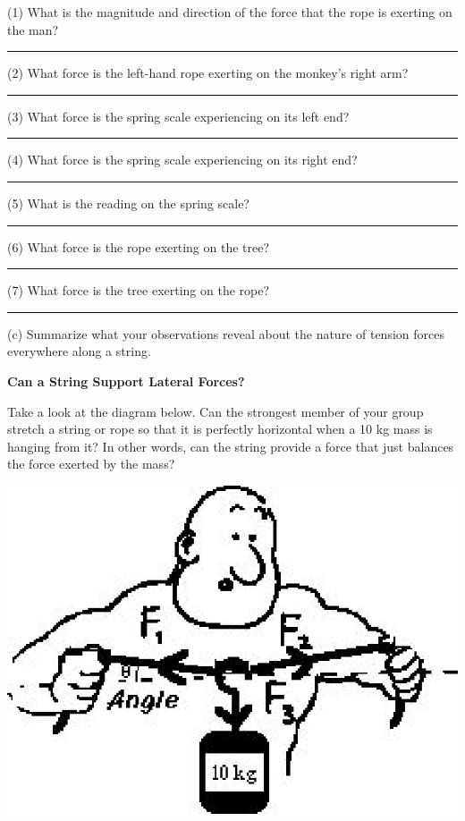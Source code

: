 (1) What is the magnitude and direction of the force that the rope is exerting
on the man? \rule{1.0in}{0.1pt}

(2) What force is the left-hand rope exerting on the monkey's right arm? \rule{1.0in}{0.1pt}

(3) What force is the spring scale experiencing on its left end? \rule{1.0in}{0.1pt}

(4) What force is the spring scale experiencing on its right end? \rule{1.0in}{0.1pt}

(5) What is the reading on the spring scale? \rule{1.0in}{0.1pt}

(6) What force is the rope exerting on the tree? \rule{1.0in}{0.1pt}

(7) What force is the tree exerting on the rope? \rule{1.0in}{0.1pt}

(c) Summarize what your observations reveal about the nature of tension forces
everywhere along a string.
\vspace{20mm}

\textbf{Can a String Support Lateral Forces? }

Take a look at the diagram below. Can the strongest member of your group stretch
a string or rope so that it is perfectly horizontal when a 10 kg mass is hanging
from it? In other words, can the string provide a force that just balances the
force exerted by the mass?

\vspace{0.3cm}
{\par\centering \includegraphics{newton_fig7.eps} \par}
\vspace{0.3cm}

